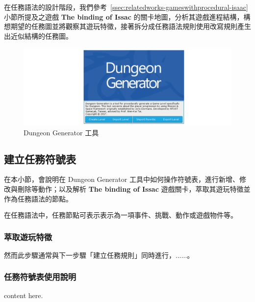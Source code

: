 在任務語法的設計階段，我們參考~\ref{ssec:relatedworks-gameswithprocedural-isaac} 小節所提及之遊戲 \textbf{The binding of Issac} 的關卡地圖，分析其遊戲進程結構，構想期望的任務圖並將觀察其遊玩特徵，接著拆分成任務語法規則使用改寫規則產生出近似結構的任務圖。

\begin{figure}[ht]
  \begin{center}
    \includegraphics[width=1.0\textwidth]{figures/Dungeon_Generator_工具.png}
    \caption{Dungeon Generator 工具} 
    \label{fig:dungeon-generator}
  \end{center}
\end{figure}

\subsection{建立任務符號表}
\label{ssec:method-missiongrammars-alphabet}

在本小節，會說明在 Dungeon Generator 工具中如何操作符號表，進行新增、修改與刪除等動作；以及解析 \textbf{The binding of Issac} 遊戲關卡，萃取其遊玩特徵並作為任務語法的節點。

在任務語法中，任務節點可表示表示為一項事件、挑戰、動作或遊戲物件等。

\subsubsection{萃取遊玩特徵}
\label{sssec:method-missiongrammars-alphabet-extractpatterns}

然而此步驟通常與下一步驟「建立任務規則」同時進行，......。

\subsubsection{任務符號表使用說明}
\label{sssec:method-missiongrammars-alphabet-manual}

content here.

